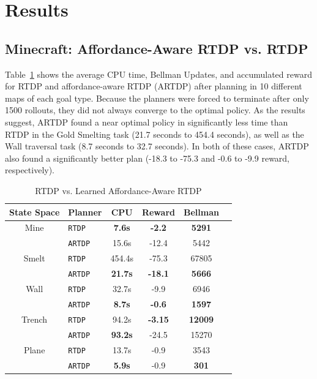 \documentclass[conference]{IEEEtran}
\begin{document}
\section{Results}
\label{sec:results}
%
\subsection{Minecraft: Affordance-Aware RTDP vs. RTDP}
%
Table~\ref{table:minecraft_results} shows the average CPU time, Bellman Updates, 
and accumulated reward for RTDP and affordance-aware RTDP (ARTDP) after 
planning in 10 different maps of each goal type. Because the planners were forced 
to terminate after only 1500 rollouts, they did not always converge to the optimal policy. 
As the results suggest, ARTDP found a near optimal policy in significantly less time than 
RTDP in the Gold Smelting task (21.7 seconds to 454.4 seconds), as well as the Wall 
traversal task (8.7 seconds to 32.7 seconds). In both of these cases, ARTDP also 
found a significantly better plan (-18.3 to -75.3 and -0.6 to -9.9 reward, respectively).

\begin{table}[H]
\centering
\begin{tabular}{ c l  || c c c c}
  State Space	&	Planner 				&	CPU	&	Reward 	& Bellman \\ \hline
  Mine 	& \texttt{RTDP}  			& 	{\bf 7.6s}	&	{\bf -2.2}	&	{\bf 5291}		\\
  		& \texttt{ARTDP}  			& 	15.6s		&	-12.4		&	5442		\\  \hline
  Smelt	&	\texttt{RTDP}  			& 	454.4s	&	-75.3		&	67805		\\
  		&	\texttt{ARTDP}  		& 	{\bf 21.7s}	&	{\bf -18.1}	&	{\bf 5666}		\\  \hline
  Wall	&	\texttt{RTDP}  			& 	32.7s		&	-9.9		&	6946		\\
  		&	\texttt{ARTDP}  		& 	{\bf 8.7s}	&	{\bf -0.6}	&	{\bf 1597}		\\  \hline
  Trench	&	\texttt{RTDP}  			& 	94.2s		&	{\bf -3.15}	&	{\bf 12009}		\\
  		&	\texttt{ARTDP}  		& 	{\bf 93.2s}	&	-24.5		&	15270		\\ \hline
Plane	&	\texttt{RTDP}  			& 	13.7s		&	-0.9		&	3543		\\
  		&	\texttt{ARTDP}  		& 	{\bf 5.9s}	&	-0.9		&	{\bf 301}		\\ 
\end{tabular}
\caption{RTDP vs. Learned Affordance-Aware RTDP}
\label{table:minecraft_results}
\end{table}
\end{document}
